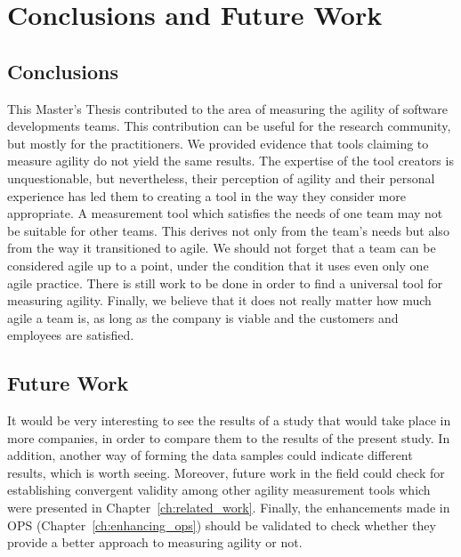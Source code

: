 \chapter{Conclusions and Future Work}
\label{ch:conclusions_future_work}

\section{Conclusions}

This Master's Thesis contributed to the area of measuring the agility of software developments teams. This contribution can be useful for the research community, but mostly for the practitioners. We provided evidence that tools claiming to measure agility do not yield the same results. The expertise of the tool creators is unquestionable, but nevertheless, their perception of agility and their personal experience has led them to creating a tool in the way they consider more appropriate. A measurement tool which satisfies the needs of one team may not be suitable for other teams. This derives not only from the team's needs but also from the way it transitioned to agile. We should not forget that a team can be considered agile up to a point, under the condition that it uses even only one agile practice. There is still work to be done in order to find a universal tool for measuring agility. Finally, we believe that it does not really matter how much agile a team is, as long as the company is viable and the customers and employees are satisfied.

\section{Future Work}

It would be very interesting to see the results of a study that would take place in more companies, in order to compare them to the results of the present study. In addition, another way of forming the data samples could indicate different results, which is worth seeing. Moreover, future work in the field could check for establishing convergent validity among other agility measurement tools which were presented in Chapter~\ref{ch:related_work}. Finally, the enhancements made in \ac{OPS} (Chapter~\ref{ch:enhancing_ops}) should be validated to check whether they provide a better approach to measuring agility or not.